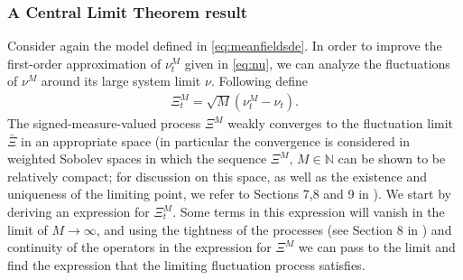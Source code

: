 \documentclass[10pt]{article}
\theoremstyle{plain}
\theoremstyle{definition}
\newcommand{\<}{\langle}
\renewcommand{\>}{\rangle}
\renewcommand{\(}{\left(}
\renewcommand{\)}{\right)}
\renewcommand{\[}{\left[}
\renewcommand{\]}{\right]}
\begin{document}
\subsubsection{A Central Limit Theorem result}
Consider again the model defined in \eqref{eq:meanfieldsde}. In order to improve the first-order approximation of $\nu_t^M$ given in \eqref{eq:nu}, we can analyze the fluctuations of $\nu^M$ around its large system limit $\nu$. Following \citet{spiliopoulos14} define 
\begin{align}
\Xi_t^M=\sqrt{M}(\nu_t^M-\nu_t).
\end{align}
The signed-measure-valued process $\Xi^M$ weakly converges to the fluctuation limit $\bar\Xi$ in an appropriate space (in particular the convergence is considered in weighted Sobolev spaces in which the sequence $\Xi^M$, $M\in\mathbb{N}$ can be shown to be relatively compact; for discussion on this space, as well as the existence and uniqueness of the limiting point, we refer to Sections 7,8 and 9 in \citet{spiliopoulos14}). We start by deriving an expression for $\Xi_t^M$. Some terms in this expression will vanish in the limit of $M\rightarrow\infty$, and using the tightness of the processes (see Section 8 in \citet{spiliopoulos14}) and continuity of the operators in the expression for $\Xi^M$ we can pass to the limit and find the expression that the limiting fluctuation process satisfies. 
\end{document}
